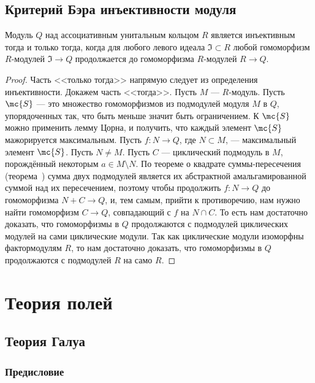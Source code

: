 \documentclass[
	extrafontsizes,
	11pt,
	hyphens,
]{memoir}
\begin{document}
\section{Критерий Бэра инъективности модуля}

\begin{theorem}
Модуль \(Q\) над ассоциативным унитальным кольцом \(R\) является инъективным тогда и только тогда, когда для любого левого идеала \(\mathfrak{I} \subset R\) любой гомоморфизм \(R\)-мо\-ду\-лей \(\mathfrak{I} \to Q\) продолжается до гомоморфизма \(R\)-мо\-ду\-лей \(R \to Q\).
\end{theorem}

\begin{proof}
Часть <<только тогда>> напрямую следует из определения инъективности. Докажем часть <<тогда>>.
Пусть \(M\) --- \(R\)-мо\-дуль.
Пусть \(\mc{S}\) --- это множество гомоморфизмов из подмодулей модуля \(M\) в \(Q\), упорядоченных
так, что быть меньше значит быть ограничением.
К \(\mc{S}\) можно применить лемму Цорна, и получить, что каждый элемент \(\mc{S}\) мажорируется максимальным.
Пусть \(f : N \to Q\), где \(N \subset M\), --- максимальный элемент \(\mc{S}\). Пусть \(N \neq M\).
Пусть \(C\) --- циклический подмодуль в \(M\), порождённый некоторым \(a \in M \setminus N\).
По теореме о квадрате суммы-пересечения (теорема~) сумма двух подмодулей является их абстрактной амальгамированной суммой над их пересечением, поэтому чтобы продолжить \(f : N \to Q\) до гомоморфизма \(N + C \to Q\), и, тем самым, прийти к противоречию, нам нужно найти гомоморфизм \(C \to Q\), совпадающий с \(f\) на \(N \cap C\).
То есть нам достаточно доказать, что гомоморфизмы в \(Q\) продолжаются с подмодулей циклических модулей на сами циклические модули. Так как циклические модули изоморфны фактормодулям \(R\), то нам достаточно доказать, что гомоморфизмы в \(Q\) продолжаются с подмодулей \(R\) на само \(R\).
\end{proof}



\chapter{Теория полей}


\section{Теория Галуа}

\subsection{Предисловие}
\end{document}
